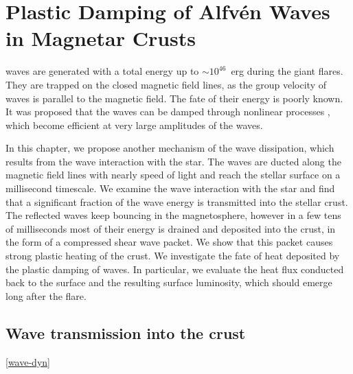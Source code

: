 
\def\T{{\mathcal T}}
\def\scr{s_{\rm cr}}
\def\Ts{T_{\rm s}}
\def\Tm{T_{\rm melt}}
\def\zmelt{z_{\rm melt}}
\def\beq{\begin{equation}}
\def\eeq{\end{equation}}
\def\sel{s_{\rm el}}
\def\spl{s_{\rm pl}}
\def\dspl{\dot{s}_{\rm pl}}
\def\sigcr{\sigma_{\rm cr}}
\def\Um{U_{\rm melt}}
\def\Uth{U_{\rm th}}
\def\Eq{Equation}
\def\Eqs{Equations}
\def\Ekin{E_{\rm kin}}
\def\Emag{E_{\rm mag}}
\def\Eel{E_{\rm el}}
\def\zd{z_{\rm damp}}
\def\Eaft{E_{\rm aft}}
\def\tc{t_{\rm cond}}
\def\LL{L}
\def\lw{l}
\def\Lum{\mathcal{L}}

\chapter[Plastic Damping  of Alfv\'en Waves in Magnetar Crusts]{Plastic Damping  of Alfv\'en Waves in Magnetar Crusts}
\label{chap:plastic-damping}
 \alfven waves are generated with a total energy up to $\sim 10^{46}$~erg during the giant flares. 
They are trapped on the closed magnetic field lines, as the group velocity of \alfven waves is parallel to the magnetic field. The fate of their energy is poorly known. 
It was proposed that the \alfven waves can be damped through nonlinear processes 
\citep{1998PhRvD..57.3219T}, which become efficient at very large amplitudes of the waves.

In this chapter, we propose another  mechanism of the \alfven wave dissipation, which 
results from the wave interaction with the star. 
The waves are ducted along the magnetic field lines with nearly speed of light and reach the stellar surface on a millisecond timescale. 
We examine the wave interaction with the star and find that a significant fraction of the wave energy is transmitted into the stellar crust. 
The reflected waves keep bouncing in the magnetosphere, however in a few tens of milliseconds most of their energy is drained and deposited into the crust, in the form of a compressed shear wave packet. 
We show that this packet causes strong plastic heating of the crust. 
We investigate the fate of heat deposited by the plastic damping of \alfven waves. 
In particular, we evaluate the heat flux conducted back to the surface and the resulting surface luminosity, which should emerge long after the flare. 

\section{Wave transmission into the crust}\ref{wave-dyn}

